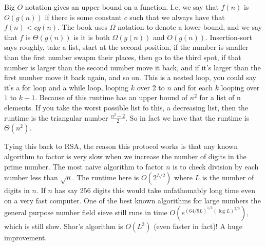 \documentclass{amsart}
\theoremstyle{definition}
\begin{document}
Big $O$ notation gives an upper bound on a function. I.e. we say that $f(n)$ is $O(g(n))$ if there is some constant $c$ such that we always have that $f(n)<cg(n)$. The book \cite{Algorithms} uses $\Omega$ notation to denote a lower bound, and we say that $f$ is $\Theta(g(n))$ is it is both $\Omega(g(n))$ and $O(g(n))$. Insertion-sort says roughly, take a list, start at the second position, if the number is smaller than the first number swapm their places, then go to the third spot, if that number is larger than the second number move it back, and if it's larger than the first number move it back again, and so on. This is a nested loop, you could say it's a for loop and a while loop, looping $k$ over 2 to $n$ and for each $k$ looping over $1$ to $k-1$. Because of this runtime has an upper bound of $n^2$ for a list of n elements. If you take the worst possible list fo this, a decreasing list, then the runtime is the triangular number $\frac{n^2-2}{2}$. So in fact we have that the runtime is $\Theta(n^2)$.

Tying this back to RSA, the reason this protocol works is that any known algorithm to factor is very slow when we increase the number of digits in the prime number. The most naive algorithm to factor $n$ is to check division by each number less than $\sqrt{n}$. The runtime here is $O(2^{L/2})$ where $L$ is the number of digits in $n$. If $n$ has say $256$ digits this would take unfathomably long time even on a very fast computer. One of the best known algorithms for large numbers the general purpose number field sieve still runs in time $O(e^{(64/9L)^{1/3}(\log L)^{2/3}})$, which is still slow. Shor's algorithm is $O(L^3)$ (even faster in fact)! A huge improvement.
\end{document}

